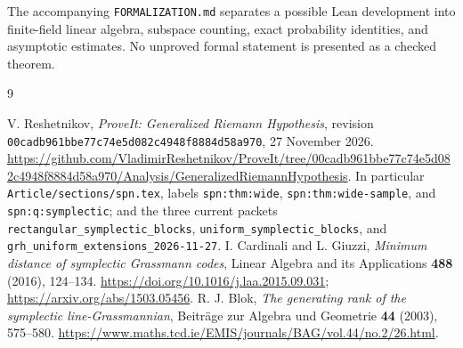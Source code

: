 \documentclass[11pt,a4paper]{article}
\theoremstyle{remark}
\begin{document}
The accompanying \texttt{FORMALIZATION.md} separates a possible Lean development into finite-field linear algebra, subspace counting, exact probability identities, and asymptotic estimates. No unproved formal statement is presented as a checked theorem.

\begin{thebibliography}{9}
\small\raggedright
{}
V. Reshetnikov, \emph{ProveIt: Generalized Riemann Hypothesis}, revision
\texttt{00cadb961bbe77c74e5d082c4948f8884d58a970}, 27 November 2026.
\url{https://github.com/VladimirReshetnikov/ProveIt/tree/00cadb961bbe77c74e5d082c4948f8884d58a970/Analysis/GeneralizedRiemannHypothesis}.
In particular \texttt{Article/sections/spn.tex}, labels \texttt{spn:thm:wide}, \texttt{spn:thm:wide-sample}, and \texttt{spn:q:symplectic}; and the three current packets \texttt{rectangular\_symplectic\_blocks}, \texttt{uniform\_symplectic\_blocks}, and \texttt{grh\_uniform\_extensions\_2026-11-27}.
I. Cardinali and L. Giuzzi, \emph{Minimum distance of symplectic Grassmann codes}, Linear Algebra and its Applications \textbf{488} (2016), 124--134.
\url{https://doi.org/10.1016/j.laa.2015.09.031}; \url{https://arxiv.org/abs/1503.05456}.
R. J. Blok, \emph{The generating rank of the symplectic line-Grassmannian}, Beitr\"age zur Algebra und Geometrie \textbf{44} (2003), 575--580.
\url{https://www.maths.tcd.ie/EMIS/journals/BAG/vol.44/no.2/26.html}.
\end{thebibliography}
\end{document}

